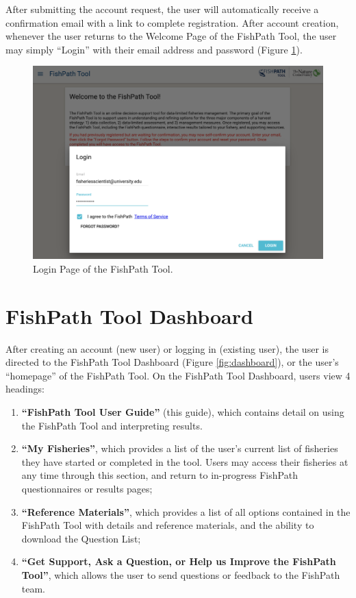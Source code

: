 \documentclass[
  11pt,
]{book}
\providecommand{\tightlist}{%
  \setlength{\itemsep}{0pt}\setlength{\parskip}{0pt}}
\begin{document}
After submitting the account request, the user will automatically receive a confirmation email with a link to complete registration. After account creation, whenever the user returns to the Welcome Page of the FishPath Tool, the user may simply ``Login'' with their email address and password (Figure \ref{fig:login-page}).

\begin{figure}

{\centering \includegraphics[width=0.95\linewidth]{images/login-page} 

}

\caption{Login Page of the FishPath Tool.}\label{fig:login-page}
\end{figure}

\hypertarget{fishpath-tool-dashboard}{%
\section{FishPath Tool Dashboard}\label{fishpath-tool-dashboard}}

After creating an account (new user) or logging in (existing user), the user is directed to the FishPath Tool Dashboard (Figure \ref{fig:dashboard}), or the user's ``homepage'' of the FishPath Tool. On the FishPath Tool Dashboard, users view 4 headings:

\begin{enumerate}
\def\labelenumi{\arabic{enumi}.}
\tightlist
\item
  \textbf{``FishPath Tool User Guide''} (this guide), which contains detail on using the FishPath Tool and interpreting results.
\item
  \textbf{``My Fisheries''}, which provides a list of the user's current list of fisheries they have started or completed in the tool. Users may access their fisheries at any time through this section, and return to in-progress FishPath questionnaires or results pages;
\item
  \textbf{``Reference Materials''}, which provides a list of all options contained in the FishPath Tool with details and reference materials, and the ability to download the Question List;
\item
  \textbf{``Get Support, Ask a Question, or Help us Improve the FishPath Tool''}, which allows the user to send questions or feedback to the FishPath team.
\end{enumerate}
\end{document}
